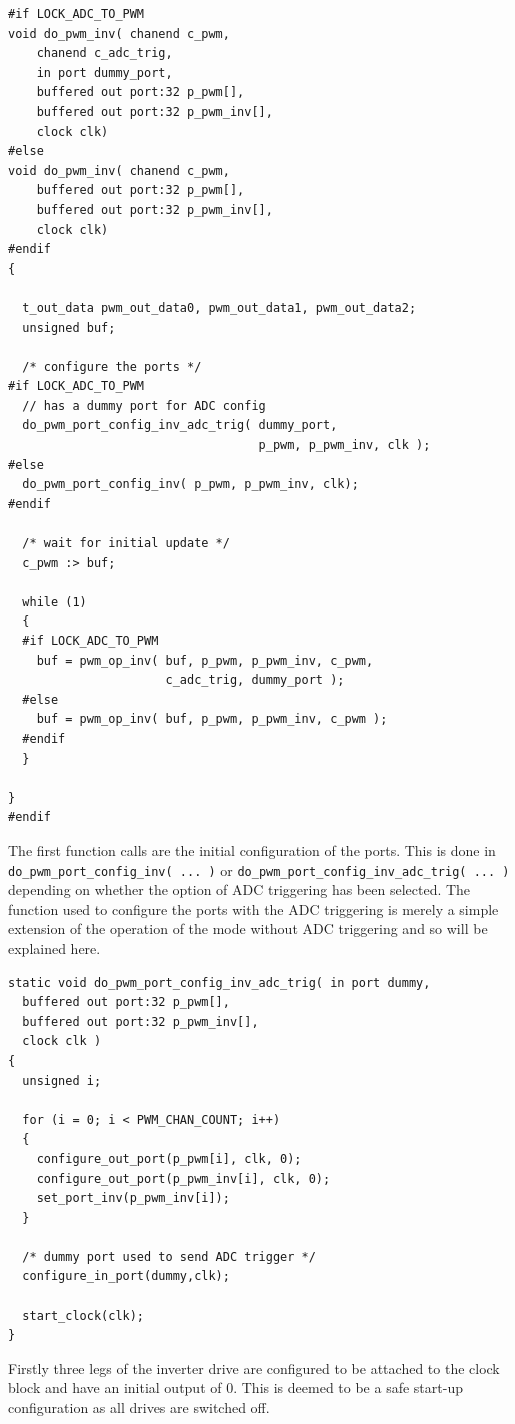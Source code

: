 \begin{lstlisting}
#if LOCK_ADC_TO_PWM
void do_pwm_inv( chanend c_pwm, 
    chanend c_adc_trig, 
    in port dummy_port, 
    buffered out port:32 p_pwm[], 
    buffered out port:32 p_pwm_inv[], 
    clock clk)
#else
void do_pwm_inv( chanend c_pwm, 
    buffered out port:32 p_pwm[],  
    buffered out port:32 p_pwm_inv[], 
    clock clk)
#endif
{

  t_out_data pwm_out_data0, pwm_out_data1, pwm_out_data2;
  unsigned buf;

  /* configure the ports */
#if LOCK_ADC_TO_PWM
  // has a dummy port for ADC config
  do_pwm_port_config_inv_adc_trig( dummy_port, 
                                   p_pwm, p_pwm_inv, clk );
#else
  do_pwm_port_config_inv( p_pwm, p_pwm_inv, clk);
#endif

  /* wait for initial update */
  c_pwm :> buf;

  while (1)
  {
  #if LOCK_ADC_TO_PWM
    buf = pwm_op_inv( buf, p_pwm, p_pwm_inv, c_pwm, 
                      c_adc_trig, dummy_port );
  #else
    buf = pwm_op_inv( buf, p_pwm, p_pwm_inv, c_pwm );
  #endif
  }

}
#endif
\end{lstlisting}

The first function calls are the initial configuration of the ports. This is done in \verb=do_pwm_port_config_inv( ... )= or \verb=do_pwm_port_config_inv_adc_trig( ... )= depending on whether the option of ADC triggering has been selected. The function used to configure the ports with the ADC triggering is merely a simple extension of the operation of the mode without ADC triggering and so will be explained here.

\begin{lstlisting}
static void do_pwm_port_config_inv_adc_trig( in port dummy, 
  buffered out port:32 p_pwm[], 
  buffered out port:32 p_pwm_inv[], 
  clock clk )
{
  unsigned i;

  for (i = 0; i < PWM_CHAN_COUNT; i++)
  {
    configure_out_port(p_pwm[i], clk, 0);
    configure_out_port(p_pwm_inv[i], clk, 0);
    set_port_inv(p_pwm_inv[i]);
  }

  /* dummy port used to send ADC trigger */
  configure_in_port(dummy,clk);

  start_clock(clk);
}
\end{lstlisting}

Firstly three legs of the inverter drive are configured to be attached to the clock block and have an initial output of 0. This is deemed to be a safe start-up configuration as all drives are switched off.

